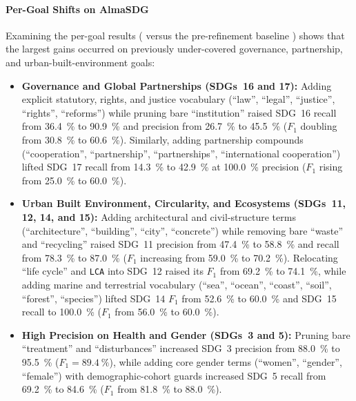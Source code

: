 \paragraph{Per-Goal Shifts on AlmaSDG}
Examining the per-goal results ( versus the pre-refinement baseline ) shows that the largest gains occurred on previously under-covered governance, partnership, and urban-built-environment goals:
\begin{itemize}
  \item \textbf{Governance and Global Partnerships (\glspl{SDG}~16 and 17):} Adding explicit statutory, rights, and justice vocabulary (\enquote{law}, \enquote{legal}, \enquote{justice}, \enquote{rights}, \enquote{reforms}) while pruning bare \enquote{institution} raised \gls{SDG}~16 recall from \qty{36.4}{\percent} to \qty{90.9}{\percent} and precision from \qty{26.7}{\percent} to \qty{45.5}{\percent} ($F_1$ doubling from \qty{30.8}{\percent} to \qty{60.6}{\percent}). Similarly, adding partnership compounds (\enquote{cooperation}, \enquote{partnership}, \enquote{partnerships}, \enquote{international cooperation}) lifted \gls{SDG}~17 recall from \qty{14.3}{\percent} to \qty{42.9}{\percent} at \qty{100.0}{\percent} precision ($F_1$ rising from \qty{25.0}{\percent} to \qty{60.0}{\percent}).
  
  \item \textbf{Urban Built Environment, Circularity, and Ecosystems (\glspl{SDG}~11, 12, 14, and 15):} Adding architectural and civil-structure terms (\enquote{architecture}, \enquote{building}, \enquote{city}, \enquote{concrete}) while removing bare \enquote{waste} and \enquote{recycling} raised \gls{SDG}~11 precision from \qty{47.4}{\percent} to \qty{58.8}{\percent} and recall from \qty{78.3}{\percent} to \qty{87.0}{\percent} ($F_1$ increasing from \qty{59.0}{\percent} to \qty{70.2}{\percent}). Relocating \enquote{life cycle} and \texttt{LCA} into \gls{SDG}~12 raised its $F_1$ from \qty{69.2}{\percent} to \qty{74.1}{\percent}, while adding marine and terrestrial vocabulary (\enquote{sea}, \enquote{ocean}, \enquote{coast}, \enquote{soil}, \enquote{forest}, \enquote{species}) lifted \gls{SDG}~14 $F_1$ from \qty{52.6}{\percent} to \qty{60.0}{\percent} and \gls{SDG}~15 recall to \qty{100.0}{\percent} ($F_1$ from \qty{56.0}{\percent} to \qty{60.0}{\percent}).
  
  \item \textbf{High Precision on Health and Gender (\glspl{SDG}~3 and 5):} Pruning bare \enquote{treatment} and \enquote{disturbances} increased \gls{SDG}~3 precision from \qty{88.0}{\percent} to \qty{95.5}{\percent} ($F_1 = \qty{89.4}{\percent}$), while adding core gender terms (\enquote{women}, \enquote{gender}, \enquote{female}) with demographic-cohort guards increased \gls{SDG}~5 recall from \qty{69.2}{\percent} to \qty{84.6}{\percent} ($F_1$ from \qty{81.8}{\percent} to \qty{88.0}{\percent}).
\end{itemize}

